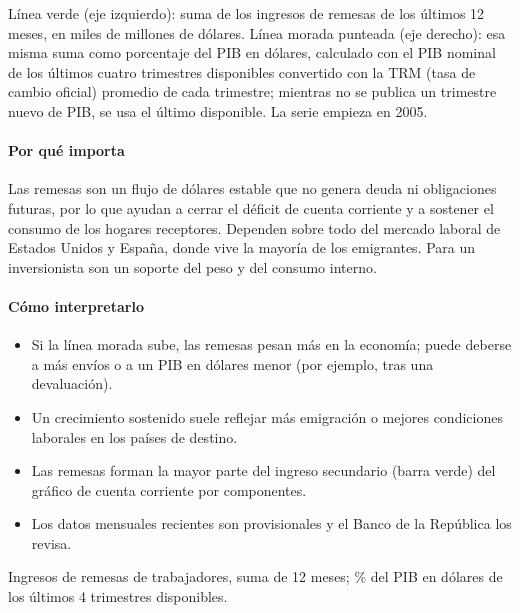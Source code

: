 \begin{leer}
Línea verde (eje izquierdo): suma de los ingresos de remesas de los últimos 12 meses, en miles de millones de dólares. Línea morada punteada (eje derecho): esa misma suma como porcentaje del PIB en dólares, calculado con el PIB nominal de los últimos cuatro trimestres disponibles convertido con la TRM (tasa de cambio oficial) promedio de cada trimestre; mientras no se publica un trimestre nuevo de PIB, se usa el último disponible. La serie empieza en 2005.
\end{leer}

\paragraph{Por qué importa}
Las remesas son un flujo de dólares estable que no genera deuda ni obligaciones futuras, por lo que ayudan a cerrar el déficit de cuenta corriente y a sostener el consumo de los hogares receptores. Dependen sobre todo del mercado laboral de Estados Unidos y España, donde vive la mayoría de los emigrantes. Para un inversionista son un soporte del peso y del consumo interno.

\paragraph{Cómo interpretarlo}
\begin{itemize}
\item Si la línea morada sube, las remesas pesan más en la economía; puede deberse a más envíos o a un PIB en dólares menor (por ejemplo, tras una devaluación).
\item Un crecimiento sostenido suele reflejar más emigración o mejores condiciones laborales en los países de destino.
\item Las remesas forman la mayor parte del ingreso secundario (barra verde) del gráfico de cuenta corriente por componentes.
\item Los datos mensuales recientes son provisionales y el Banco de la República los revisa.
\end{itemize}
\begin{formulas}[Fórmulas]
\end{formulas}
\begin{metodo}[Metodología]
Ingresos de remesas de trabajadores, suma de 12 meses; \% del PIB en dólares de los últimos 4 trimestres disponibles.
\par{}
\end{metodo}

